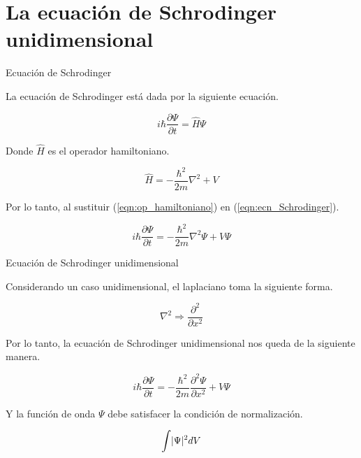 \section{La ecuación de Schrodinger unidimensional}


\begin{frame}{Ecuación de Schrodinger }

    La ecuación de Schrodinger  está dada por la siguiente ecuación.

    \begin{equation}
        i \hbar \frac{\partial \Psi }{\partial t} = \hat{H} \Psi
        \label{eqn:ecn_Schrodinger}
    \end{equation}

    Donde $\hat{H}$ es el operador hamiltoniano.

    \begin{equation}
        \hat{H} = -\frac{ \hbar^2 }{2m} \nabla^2 + V
        \label{eqn:op_hamiltoniano}
    \end{equation}

    Por lo tanto, al sustituir (\ref{eqn:op_hamiltoniano}) en (\ref{eqn:ecn_Schrodinger}).

    \begin{equation}
        i \hbar \frac{\partial \Psi }{\partial t}
        = 
        -\frac{ \hbar^2 }{2m} \nabla^2 \Psi + V \Psi
    \end{equation}

\end{frame}


\begin{frame}{Ecuación de Schrodinger unidimensional}

    Considerando un caso unidimensional, el laplaciano toma la siguiente forma.

    \begin{equation}
        \nabla^2 \Longrightarrow \frac{\partial^2 }{\partial x^2}
    \end{equation}

    
    Por lo tanto, la ecuación de Schrodinger unidimensional nos queda de la siguiente manera.

    \begin{equation}
        i \hbar \frac{\partial \Psi }{\partial t}
        = 
        -\frac{ \hbar^2 }{2m} \frac{\partial^2 \Psi}{\partial x^2} + V \Psi
        \label{eqn:ecn_Schrodinger_1d}
    \end{equation}

    Y la función de onda $\Psi$ debe satisfacer la condición de normalización.

    \begin{equation}
        \int \lvert \Psi \rvert^2 dV
        \label{eqn:cond_normalizacion_gral}
    \end{equation}

\end{frame}


